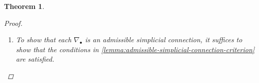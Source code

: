 \documentclass[11pt,fleqn]{article}
\theoremstyle{plain}
\newtheorem{theorem}{Theorem}[subsection]
\theoremstyle{definition}
\theoremstyle{remark}
\numberwithin{equation}{theorem}
\newcommand{\restricted}{\mathbin{\big\vert}}
\begin{document}
\begin{theorem}
\begin{proof}
\begin{enumerate}
                        \medskip

                        Looking ahead to \cref{equation:Ep-decomposed-into-Ep-1}, since we have extended by something \emph{compatible} on $\mathcal{K}_{p-1,i,p}$, the characteristic class of $\mathcal{K}_{p-1,i,p}$ will be 1, as mentioned above.
                        This means, by additivity of characteristic classes, that the classes of $\mathcal{E}^{p-1}\restricted U_{\alpha_0\ldots\alpha_p}$ and $\mathcal{E}^p\restricted U_{\alpha_0\ldots\alpha_p}$ will agree.
                        This is the content of half of the proof of \cite[Lemma~2.2]{Green1980}.
                    \item To show that each $\nabla_\bullet$ is an \emph{admissible} simplicial connection, it suffices to show that the conditions in \cref{lemma:admissible-simplicial-connection-criterion} are satisfied.


\end{enumerate}
\end{proof}
\end{theorem}
\end{document}
